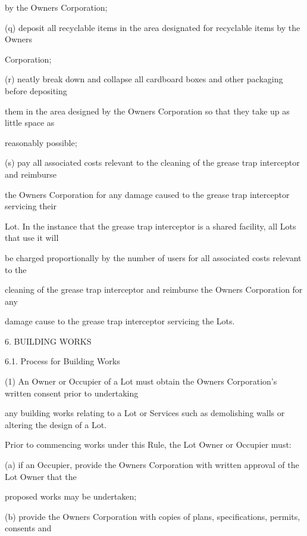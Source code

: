 \documentclass{article}
\begin{document}
{\fontsize{10.02}{1}by the Owners Corporation;  }

{\fontsize{9.962}{1}(q) deposit all recyclable items in the area designated for recyclable items by the Owners }

{\fontsize{10.02}{1}Corporation; }

{\fontsize{9.962}{1}(r) neatly break down and collapse all cardboard boxes and other packaging before depositing }

{\fontsize{10.02}{1}them in the area designed by the Owners Corporation so that they take up as little space as }

{\fontsize{10.02}{1}reasonably possible; }

{\fontsize{9.962}{1}(s) pay all associated costs relevant to the cleaning of the grease trap interceptor and reimburse }

{\fontsize{10.02}{1}the Owners Corporation for any damage caused to the grease trap interceptor servicing their }

{\fontsize{10.02}{1}Lot. In the instance that the grease trap interceptor is a shared facility, all Lots that use it will }

{\fontsize{10.02}{1}be charged proportionally by the number of users for all associated costs relevant to the }

{\fontsize{10.02}{1}cleaning of the grease trap interceptor and reimburse the Owners Corporation for any }

{\fontsize{10.02}{1}damage cause to the grease trap interceptor servicing the Lots. }


{\fontsize{9.99}{1}6. BUILDING WORKS }

{\fontsize{9.99}{1}6.1. Process for Building Works }

{\fontsize{9.962}{1}(1) An Owner or Occupier of a Lot must obtain the Owners Corporation’s written consent prior to undertaking }

{\fontsize{10.02}{1}any building works relating to a Lot or Services such as demolishing walls or altering the design of a Lot. }

{\fontsize{10.02}{1}Prior to commencing works under this Rule, the Lot Owner or Occupier must: }

{\fontsize{9.962}{1}(a) if an Occupier, provide the Owners Corporation with written approval of the Lot Owner that the }

{\fontsize{10.02}{1}proposed works may be undertaken; }

{\fontsize{9.962}{1}(b) provide the Owners Corporation with copies of plans, specifications, permits, consents and }
\end{document}
